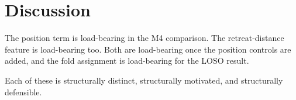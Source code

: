 \section{Discussion}

The position term is load-bearing in the M4 comparison. The retreat-distance
feature is load-bearing too. Both are load-bearing once the position controls
are added, and the fold assignment is load-bearing for the LOSO result.

Each of these is structurally distinct, structurally motivated, and
structurally defensible.
